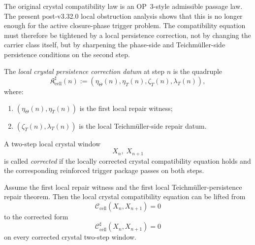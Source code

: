 \begin{remark}
\label{rem:why-crystal-equation-must-be-corrected-locally}
The original crystal compatibility law is an OP~3-style admissible passage law. The present post-v3.32.0 local obstruction analysis shows that this is no longer enough for the active closure-phase trigger problem. The compatibility equation must therefore be tightened by a local persistence correction, not by changing the carrier class itself, but by sharpening the phase-side and Teichmüller-side persistence conditions on the second step.
\end{remark}

\begin{definition}
\label{def:local-crystal-persistence-correction-datum}
The \emph{local crystal persistence correction datum} at step $n$ is the quadruple
\[
  \mathfrak K_{\mathrm{cell}}^{\sharp}(n)
  :=
  (\eta_{\Theta}(n),\eta_T(n),\zeta_T(n),\lambda_T(n)),
\]
where:
\begin{enumerate}[leftmargin=2em,label=(\roman*)]
  \item $(\eta_{\Theta}(n),\eta_T(n))$ is the first local repair witness;
  \item $(\zeta_T(n),\lambda_T(n))$ is the local Teichmüller-side repair datum.
\end{enumerate}
\end{definition}

\begin{definition}
\label{def:corrected-crystal-two-step-window}
A two-step local crystal window
\[
  X_n,\;X_{n+1}
\]
is called \emph{corrected} if the locally corrected crystal compatibility equation holds and the corresponding reinforced trigger package passes on both steps.
\end{definition}

\begin{proposition}
\label{prop:teichmueller-repair-lifts-crystal-equation}
Assume the first local repair witness and the first local Teichmüller-persistence repair theorem. Then the local crystal compatibility equation can be lifted from
\[
  \mathcal C_{\mathrm{cell}}(X_n,X_{n+1})=0
\]
to the corrected form
\[
  \mathcal C_{\mathrm{cell}}^{\sharp}(X_n,X_{n+1})=0
\]
on every corrected crystal two-step window.
\end{proposition}

